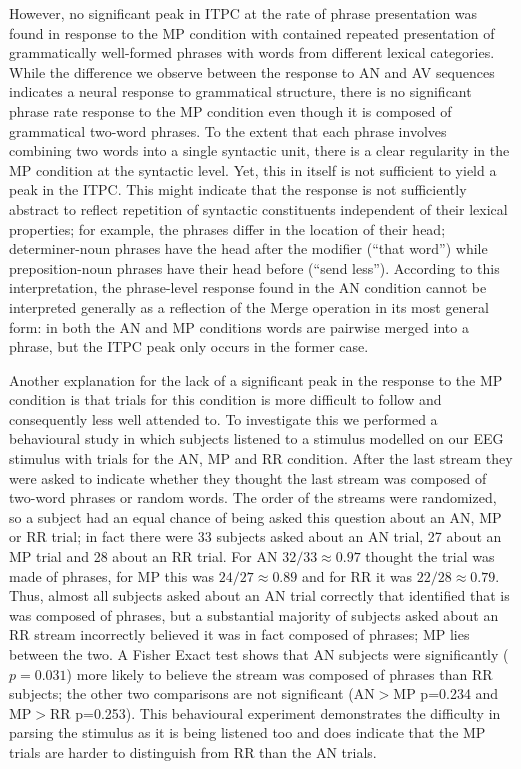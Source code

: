 \documentclass[10pt,letterpaper]{article}
\newcommand{\citet}[1]{\cite{#1}}
\begin{document}
However, no significant peak in ITPC at the rate of phrase presentation was found in response to the MP condition with contained repeated presentation of grammatically well-formed phrases with words from different lexical categories. While the difference we observe between the response to AN and AV sequences indicates a neural response to grammatical structure, there is no significant phrase rate response to the MP condition even though it is composed of grammatical two-word phrases. To the extent that each phrase involves combining two words into a single syntactic unit, there is a clear regularity in the MP condition at the syntactic level. Yet, this in itself is not sufficient to yield a peak in the ITPC. This might indicate that the response is not sufficiently abstract to reflect repetition of syntactic constituents independent of their lexical properties; for example, the phrases differ in the location of their head; determiner-noun phrases have the head after the modifier (``that word'') while preposition-noun phrases have their head before (``send less''). According to this interpretation, the phrase-level response found in the AN condition cannot be interpreted generally as a reflection of the Merge operation \citet{Chomsky1995} in its most general form: in both the AN and MP conditions words are pairwise merged into a phrase, but the ITPC peak only occurs in the former case.

Another explanation for the lack of a significant peak in the response
to the MP condition is that trials for this condition is more
difficult to follow and consequently less well attended to. To
investigate this we performed a behavioural study in which subjects
listened to a stimulus modelled on our EEG stimulus with trials for
the AN, MP and RR condition. After the last stream they were asked to
indicate whether they thought the last stream was composed of two-word
phrases or random words. The order of the streams were randomized, so
a subject had an equal chance of being asked this question about an
AN, MP or RR trial; in fact there were 33 subjects asked about an AN
trial, 27 about an MP trial and 28 about an RR trial. For AN
$32/33\approx 0.97$ thought the trial was made of phrases, for MP this
was $24/27\approx 0.89$ and for RR it was $22/28\approx 0.79$. Thus,
almost all subjects asked about an AN trial correctly that identified
that is was composed of phrases, but a substantial majority of
subjects asked about an RR stream incorrectly believed it was in fact
composed of phrases; MP lies between the two. A Fisher Exact test
shows that AN subjects were significantly ($p=0.031$) more likely to
believe the stream was composed of phrases than RR subjects; the other
two comparisons are not significant (AN$>$MP p=0.234 and MP$>$RR
p=0.253). This behavioural experiment demonstrates the difficulty in
parsing the stimulus as it is being listened too and does indicate
that the MP trials are harder to distinguish from RR than the AN
trials.
\end{document}
